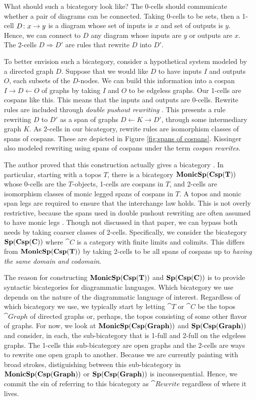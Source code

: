 \documentclass[./1--Catfying_zxCalc--Master.tex]{subfiles} %
\begin{document}
What should such a bicategory look like? 
The 0-cells should 
communicate whether a pair of diagrams
can be connected.
Taking 0-cells to be sets, 
then a 1-cell $D \colon x \to y$ is 
a diagram whose set of inputs is $x$ 
and set of outputs is $y$. 
Hence, we can connect to $D$ any
diagram whose inputs are $y$ or 
outputs are $x$.  
The 2-cells $D \Rightarrow D'$ are 
rules that rewrite $D$ into $D'$.  

To better envision such a bicategory, 
consider a hypothetical system
modeled by a directed graph $D$. 
Suppose that we would like $D$ 
to have inputs $I$ and outputs $O$, 
each subsets of the $D$-nodes.  
We can build this information 
into a cospan $I \to D \gets O$
of graphs by taking $I$ and $O$ 
to be edgeless graphs.  
Our 1-cells are cospans like this.  
This means that the 
inputs and outputs are $0$-cells.
Rewrite rules are included 
through \emph{double pushout rewriting}
	\cite{Corradini_AlgApprGraphTrans}. 
This presents a rule rewriting $D$ to $D'$ as 
a span of graphs 
$D \gets K \to D'$, 
through some intermediary graph $K$. 
As 2-cells in our bicategory, rewrite rules
are isomorphism classes of spans of cospans. 
These are depicted in Figure \ref{fig:spans of cospans}.  
Kissinger
	\cite{Kissinger_Pictures}
also modeled rewriting using spans of cospans
under the term \emph{cospan rewrites}.	 

The author proved that 
this construction
actually gives a bicategory
	\cite{Cicala_SpansCospans}.  
In particular, 
starting with a topos $T$, there is a 
bicategory $\mathbf{MonicSp(Csp(T))}$ whose 
0-cells are the $T$-objects, 
1-cells are cospans in $T$, and
2-cells are isomorphism classes of 
monic legged spans of cospans in $T$.
A topos and monic span legs are required to
ensure that the interchange law holds. 
This is not overly restrictive,
because the spans used in 
double pushout rewriting are
often assumed to have 
monic legs \cite{Habel}.
Though not discussed in that paper, 
we can bypass both needs 
by taking coarser classes of 2-cells. 
Specifically, we consider the bicategory 
$\mathbf{Sp(Csp(C))}$ 
where $\cat{C}$ is a category with 
finite limits and colimits. 
This differs from $\mathbf{MonicSp(Csp(T))}$ by 
taking 2-cells to be all spans of cospans
up to \emph{having the same domain and codomain}.

The reason for constructing
$\mathbf{MonicSp(Csp(T))}$ and $\mathbf{Sp(Csp(C))}$ 
is to provide syntactic bicategories for 
diagrammatic languages. 
Which bicategory we use depends
on the nature of the diagrammatic
language of interest.
Regardless of which bicategory we use,
we typically start by letting
$\cat{T}$ or $\cat{C}$ be the 
topos $\cat{Graph}$ of directed graphs
or, perhaps, the topos consisting
of some other flavor of graphs. 
For now, we look at 
$\mathbf{MonicSp(Csp(Graph))}$ and $\mathbf{Sp(Csp(Graph))}$
and consider, in each,
the sub-bicategory 
that is 1-full and 2-full 
on the edgeless graphs.  
The 1-cells this sub-bicategory are open graphs 
and the 2-cells are ways to rewrite 
one open graph to another.  
Because we are currently painting with broad strokes,
distiguishing between this sub-bicategory in
$\mathbf{MonicSp(Csp(Graph))}$ or $\mathbf{Sp(Csp(Graph))}$
is inconsequential.
Hence, we commit the sin of
referring to this bicategory as $\cat{Rewrite}$
regardless of where it lives.
\end{document}
